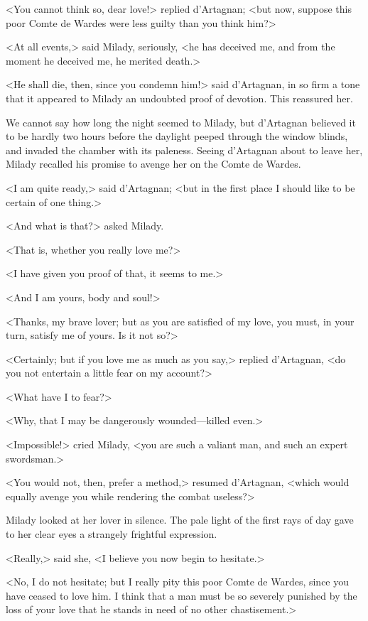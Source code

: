 <You cannot think so, dear love!> replied d'Artagnan; <but now, suppose this poor Comte de Wardes were less guilty than you think him?> 

<At all events,> said Milady, seriously, <he has deceived me, and from the moment he deceived me, he merited death.> 

<He shall die, then, since you condemn him!> said d'Artagnan, in so firm a tone that it appeared to Milady an undoubted proof of devotion. This reassured her. 

We cannot say how long the night seemed to Milady, but d'Artagnan believed it to be hardly two hours before the daylight peeped through the window blinds, and invaded the chamber with its paleness. Seeing d'Artagnan about to leave her, Milady recalled his promise to avenge her on the Comte de Wardes. 

<I am quite ready,> said d'Artagnan; <but in the first place I should like to be certain of one thing.> 

<And what is that?> asked Milady. 

<That is, whether you really love me?> 

<I have given you proof of that, it seems to me.> 

<And I am yours, body and soul!> 

<Thanks, my brave lover; but as you are satisfied of my love, you must, in your turn, satisfy me of yours. Is it not so?> 

<Certainly; but if you love me as much as you say,> replied d'Artagnan, <do you not entertain a little fear on my account?> 

<What have I to fear?> 

<Why, that I may be dangerously wounded---killed even.> 

<Impossible!> cried Milady, <you are such a valiant man, and such an expert swordsman.> 

<You would not, then, prefer a method,> resumed d'Artagnan, <which would equally avenge you while rendering the combat useless?> 

Milady looked at her lover in silence. The pale light of the first rays of day gave to her clear eyes a strangely frightful expression. 

<Really,> said she, <I believe you now begin to hesitate.> 

<No, I do not hesitate; but I really pity this poor Comte de Wardes, since you have ceased to love him. I think that a man must be so severely punished by the loss of your love that he stands in need of no other chastisement.> 

